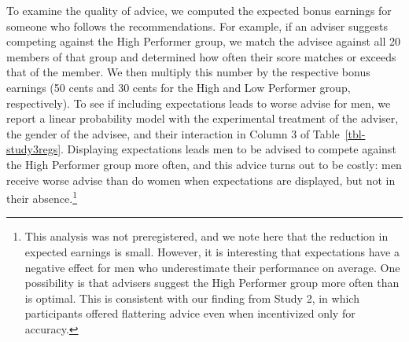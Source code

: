 \documentclass[
  man,
  floatsintext,
  longtable,
  nolmodern,
  notxfonts,
  notimes,
  colorlinks=true,linkcolor=blue,citecolor=blue,urlcolor=blue]{apa7}
\begin{document}
To examine the quality of advice, we computed the expected bonus
earnings for someone who follows the recommendations. For example, if an
adviser suggests competing against the High Performer group, we match
the advisee against all 20 members of that group and determined how
often their score matches or exceeds that of the member. We then
multiply this number by the respective bonus earnings (50 cents and 30
cents for the High and Low Performer group, respectively). To see if
including expectations leads to worse advise for men, we report a linear
probability model with the experimental treatment of the adviser, the
gender of the advisee, and their interaction in Column 3 of
Table~\ref{tbl-study3regs}. Displaying expectations leads men to be
advised to compete against the High Performer group more often, and this
advice turns out to be costly: men receive worse advise than do women
when expectations are displayed, but not in their absence.\footnote{This
  analysis was not preregistered, and we note here that the reduction in
  expected earnings is small. However, it is interesting that
  expectations have a negative effect for men who underestimate their
  performance on average. One possibility is that advisers suggest the
  High Performer group more often than is optimal. This is consistent
  with our finding from Study 2, in which participants offered
  flattering advice even when incentivized only for accuracy.}
\end{document}
